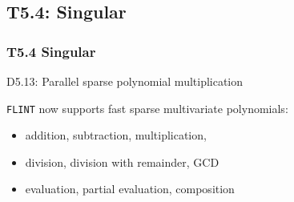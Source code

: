 \documentclass{beamer}
\begin{document}
\subsection{T5.4: Singular}
\begin{frame}
  \frametitle{T5.4 Singular}
  \begin{block}
    {D5.13: Parallel sparse polynomial multiplication}
    
    \texttt{FLINT} now supports fast sparse multivariate polynomials:
    \begin{itemize}
    \item addition, subtraction, multiplication,
    \item division, division with remainder, GCD
    \item evaluation, partial evaluation, composition
    \end{itemize}

\end{block}
\end{frame}
\end{document}
